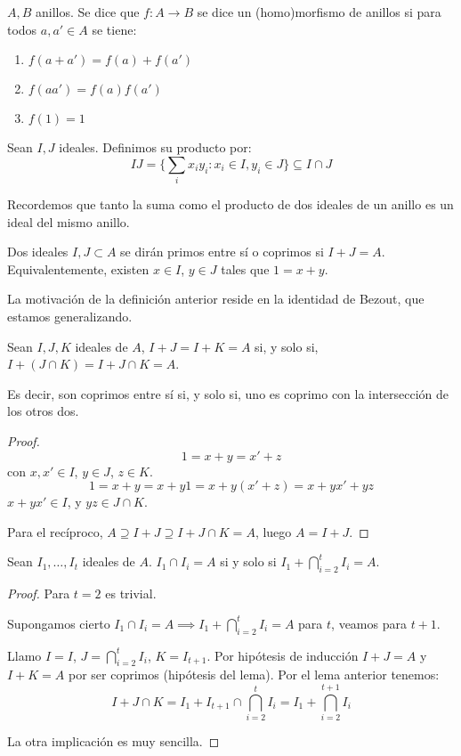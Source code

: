 \begin{df}
  \(A,B\) anillos. Se dice que \(f:A\longrightarrow B\) se dice un
  (homo)morfismo de anillos si para todos \(a,a'\in A\) se tiene:
  \begin{enumerate}
    \item \(f(a+a')=f(a)+f(a')\)
    \item \(f(aa')=f(a)f(a')\)
    \item \(f(1)=1\)
  \end{enumerate}
\end{df}

\begin{df}
  Sean \(I, J\) ideales. Definimos su producto por:
  \[
    IJ=\{\sum_i x_i y_i: x_i\in I, y_i\in J\}\subseteq I\cap J
  \]
\end{df}


\noindent Recordemos que tanto la suma como el producto de dos ideales de un anillo es un ideal del mismo anillo.

\begin{df}
  Dos ideales \(I, J\subset A\) se dirán primos entre sí
  o coprimos si \(I+J=A\). Equivalentemente, existen \(x\in I\), \(y\in J\) tales que
  \(1=x+y\).
\end{df}

\noindent La motivación de la definición anterior reside en la identidad
de Bezout, que estamos generalizando.

\begin{lema}
  Sean \(I, J, K\) ideales de \(A\),
  \(I+J=I+K=A\) si, y solo si, \(I+(J\cap K)=I+J\cap K=A\).

  Es decir, son coprimos entre sí si, y solo si, uno es coprimo
  con la intersección de los otros dos.
\end{lema}
\begin{proof}
  \[1=x+y=x'+z\]
  con \(x,x'\in I\), \(y\in J\), \(z\in K\).
  \[1=x+y=x+y1=x+y(x'+z)=x+yx'+yz\]
  \(x+yx'\in I\), y \(yz\in J\cap K\).

  Para el recíproco, \(A\supseteq I+J\supseteq I+J\cap K=A\),
  luego \(A=I+J\).
\end{proof}

\begin{lema}
  Sean \(I_1,\ldots, I_t\) ideales de \(A\).
  \(I_1\cap I_i=A\) si y solo si
  \(I_1+\bigcap_{i=2}^t I_i=A\).
\end{lema}
\begin{proof}
  Para \(t=2\) es trivial.

  Supongamos cierto \(I_1\cap I_i=A\implies
  I_1+\bigcap_{i=2}^t I_i=A\) para \(t\), veamos para \(t+1\).

  Llamo \(I=I\), \(J=\bigcap_{i=2}^t I_i\), \(K=I_{t+1}\).
  Por hipótesis de inducción \(I+J=A\) y \(I+K=A\) por ser coprimos
  (hipótesis del lema). Por el lema anterior tenemos:
  \[
    I+J\cap K=I_1+I_{t+1}\cap \bigcap_{i=2}^{t}
    I_i =I_1 + \bigcap_{i=2}^{t+1} I_i
  \]

  La otra implicación es muy sencilla.
\end{proof}

